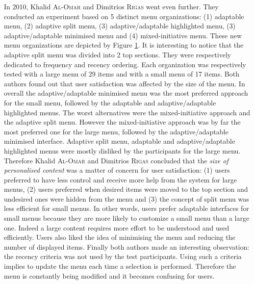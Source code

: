 In 2010, Khalid \textsc{Al-Omar} and Dimitrios \textsc{Rigas} went even 
further. They conducted 
an experiment based on 5 distinct menu organizations: (1) adaptable menu, (2) 
adaptive split menu, (3) adaptive/adaptable highlighted menu, (3) 
adaptive/adaptable minimised menu and (4) mixed-initiative menu. These new menu 
organizations are depicted by Figure \ref{fig:khalid_menus}. It is interesting 
to notice that the adaptive split menu was divided into 2 top sections. They 
were respectively dedicated to frequency and recency ordering. Each 
organization was respectively tested with a large menu of 29 items and with a 
small menu of 17 items. Both authors found out that user satisfaction was 
affected by the size of the menu. In overall the adaptive/adaptable minimised 
menu was the most preferred approach for the small menu, followed by the 
adaptable and adaptive/adaptable highlighted menus. The worst alternatives were 
the mixed-initiative approach and the adaptive split menu. However the 
mixed-initiative approach was by far the most preferred one for the large menu, 
followed by the adaptive/adaptable minimised interface. Adaptive split menu, 
adaptable and adaptive/adaptable highlighted menus were mostly disliked by the 
participants for the large menu. Therefore Khalid \textsc{Al-Omar} and 
Dimitrios \textsc{Rigas} 
concluded that the \textit{size of personalised content} was a matter of 
concern for 
user satisfaction: (1) users preferred to have less control and receive more 
help from the system for large menus, (2) users preferred when desired items 
were moved to the top section and undesired ones were hidden from the menu and 
(3) the concept of split menu was less efficient for small menus. In other 
words, users prefer adaptable interfaces for small menus because they are more 
likely to customize a small menu than a large one. Indeed a large content 
requires more effort to be understood and used efficiently. Users also liked 
the 
idea of minimising the menu and reducing the number of displayed items. Finally 
both authors made an interesting observation: the recency criteria was not 
used 
by the test participants. Using such a criteria implies to update the menu each 
time a selection is performed. Therefore the menu is constantly being modified 
and it becomes confusing for users.\newline

\begin{figure}[!ht]
    
    \label{fig:khalid_menus}
\end{figure}

